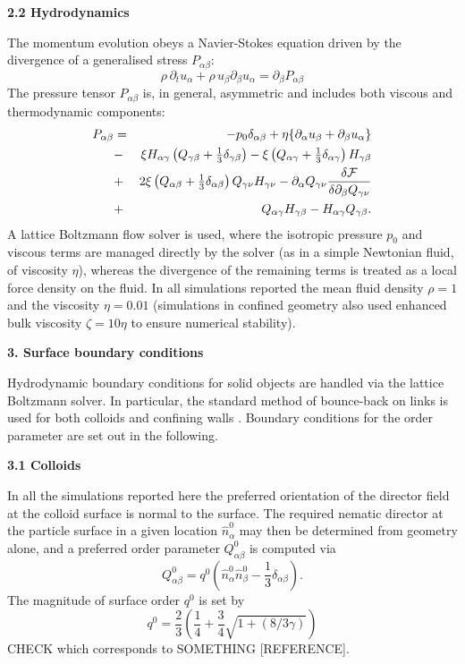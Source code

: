 \documentclass[12pt,twoside]{article}
\begin{document}
{\bf 2.2 Hydrodynamics}

The momentum evolution obeys a Navier-Stokes equation driven by the divergence
of a generalised stress $P_{\alpha\beta}$:
\begin{equation}
\label{nse}
\rho\,\partial_tu_\alpha +\rho \,u_\beta \partial_\beta u_\alpha
=\partial_\beta P_{\alpha\beta}
\end{equation}
The pressure tensor $P_{\alpha\beta}$ is, in general, asymmetric and includes
both viscous and thermodynamic components:
\begin{eqnarray}
P_{\alpha \beta}&=&
- p_0 \delta_{\alpha \beta} 
+ \eta \{ \partial_\alpha u_\beta + \partial_\beta u_\alpha\}
\nonumber\\
&-&  \xi H_{\alpha \gamma}\left(Q_{\gamma \beta}
+ {\textstyle \frac{1}{3}} \delta_{\gamma \beta} \right)
-\xi \left(Q_{\alpha \gamma}
+ { \textstyle \frac{1}{3}} \delta_{\alpha \gamma}\right) H_{\gamma \beta}
\nonumber\\ 
&+& 2 \xi  \left(Q_{\alpha \beta}
+ {\textstyle \frac{1}{3}} \delta_{\alpha \beta}\right) Q_{\gamma \nu} H_{\gamma \nu}
-\partial_\alpha Q_{\gamma \nu}
\frac{\delta{\cal F}}{\delta \partial_{\beta} Q_{\gamma \nu}}\nonumber\\
&+& Q_{\alpha \gamma}H_{\gamma \beta}-H_{\alpha \gamma} Q_{\gamma \beta}.
\end{eqnarray}
A lattice Boltzmann flow solver is used, where the isotropic pressure $p_0$
and viscous terms are managed directly by the solver (as in a simple Newtonian
fluid, of viscosity $\eta$), whereas the divergence of the remaining terms
is treated as a local force density on the fluid. In all simulations
reported the mean fluid density $\rho = 1$ and the viscosity
$\eta = 0.01$ (simulations in confined geometry also used enhanced
bulk viscosity $\zeta = 10\eta$ to ensure numerical stability).


{\bf 3. Surface boundary conditions}

Hydrodynamic boundary conditions for solid objects are handled via
the lattice Boltzmann solver. In particular, the standard method of
bounce-back on links is used for both colloids and confining walls
\cite{ladd94,nguyen2002}. Boundary conditions for the order parameter
are set out in the following.

{\bf 3.1 Colloids}

In all the simulations reported here the preferred orientation of the
director field at the colloid surface is normal to the surface. The
required nematic director at the particle surface in a given location
$\hat{n}^0_\alpha$ may then be determined from geometry alone,
and a preferred order parameter $Q_{\alpha\beta}^0$ is computed via
\begin{equation}
Q^0_{\alpha\beta} = q^0(\hat{n}_\alpha^0 \hat{n}_\beta^0 
- {\textstyle \frac{1}{3}} \delta_{\alpha\beta}).
\label{eq:surf_q}
\end{equation}
The magnitude of surface order $q^0$ is set by
\begin{equation}
q^0 = {\textstyle \frac{2}{3}} \left( {\textstyle \frac{1}{4}} 
+ {\textstyle \frac{3}{4}} \sqrt{1 + (8/3\gamma)} \right)
\label{eq:surf_q0}
\end{equation}
CHECK which corresponds to SOMETHING [REFERENCE].
\end{document}
